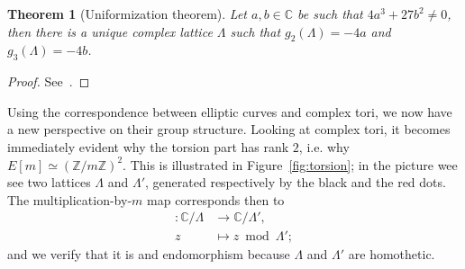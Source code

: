 \documentclass[10pt]{article}
\theoremstyle{plain}
\newtheorem{theorem}{Theorem}
\theoremstyle{definition}
\begin{document}
\begin{theorem}[Uniformization theorem]
  Let $a,b∈ℂ$ be such that $4a^3+27b^2≠0$, then there is a unique
  complex lattice $Λ$ such that $g_2(Λ) = -4a$ and $g_3(Λ) = -4b$.
\end{theorem}
\begin{proof}
  See~\cite[I, Coro.~4.3]{silverman:advanced}.
\end{proof}

Using the correspondence between elliptic curves and complex tori, we
now have a new perspective on their group structure. %
Looking at complex tori, it becomes immediately evident why the
torsion part has rank $2$, i.e. why $E[m]≃(ℤ/mℤ)^2$. %
This is illustrated in Figure~\ref{fig:torsion}; in the picture wee
see two lattices $Λ$ and $Λ'$, generated respectively by the black and
the red dots. %
The multiplication-by-$m$ map corresponds then to
\begin{align*}
  [m] : ℂ/Λ &\to ℂ/Λ',\\
  z &\mapsto z \bmod Λ';
\end{align*}
and we verify that it is and endomorphism because $Λ$ and $Λ'$ are
homothetic.
\end{document}
